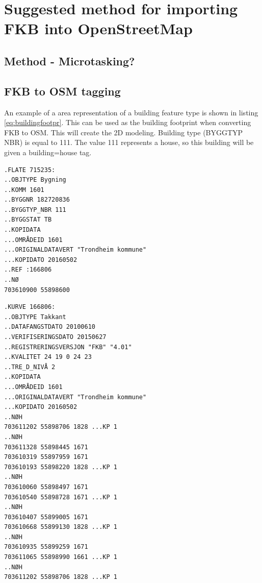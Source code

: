 \chapter{Suggested method for importing FKB into OpenStreetMap}

\section{Method - Microtasking?}



\section{FKB to OSM tagging}

An example of a area representation of a building feature type is shown in listing \ref{eq:buildingfootpr}. This can be used as the building footprint when converting FKB to OSM. This will create the 2D modeling. Building type (BYGGTYP NBR) is equal to 111. The value 111 represents a house, so this building will be given a building=house tag. 

\begin{lstlisting}
.FLATE 715235:
..OBJTYPE Bygning
..KOMM 1601
..BYGGNR 182720836
..BYGGTYP_NBR 111
..BYGGSTAT TB
..KOPIDATA
...OMRÅDEID 1601
...ORIGINALDATAVERT "Trondheim kommune"
...KOPIDATO 20160502
..REF :166806
..NØ
703610900 55898600
\end{lstlisting}

\begin{lstlisting}
.KURVE 166806:
..OBJTYPE Takkant
..DATAFANGSTDATO 20100610
..VERIFISERINGSDATO 20150627
..REGISTRERINGSVERSJON "FKB" "4.01"
..KVALITET 24 19 0 24 23
..TRE_D_NIVÅ 2
..KOPIDATA
...OMRÅDEID 1601
...ORIGINALDATAVERT "Trondheim kommune"
...KOPIDATO 20160502
..NØH
703611202 55898706 1828 ...KP 1  
..NØH
703611328 55898445 1671
703610319 55897959 1671
703610193 55898220 1828 ...KP 1
..NØH
703610060 55898497 1671
703610540 55898728 1671 ...KP 1
..NØH
703610407 55899005 1671
703610668 55899130 1828 ...KP 1
..NØH
703610935 55899259 1671
703611065 55898990 1661 ...KP 1
..NØH
703611202 55898706 1828 ...KP 1
\end{lstlisting}

